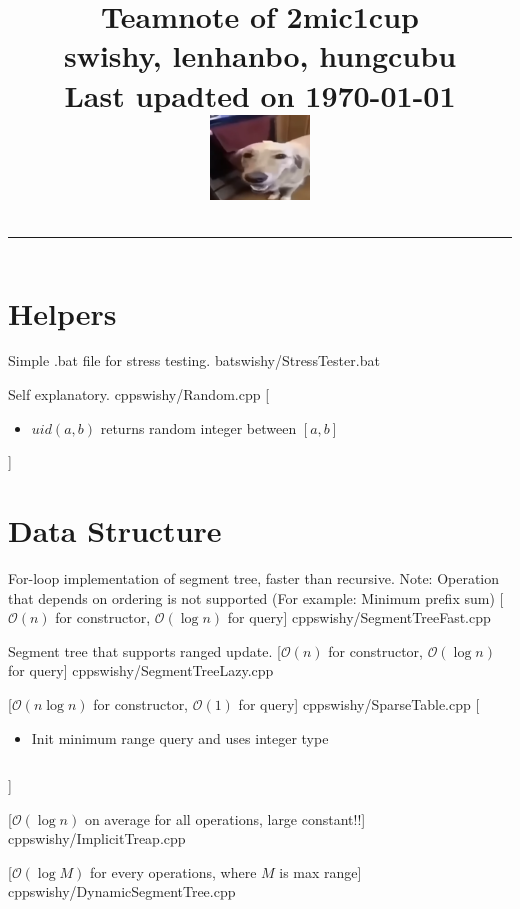\documentclass[10pt,a4paper,oneside,twocolumn]{article}
\title{
    Teamnote of 2mic1cup \\ \vspace{1em}
    \large swishy, lenhanbo, hungcubu \\ \vspace{1em}
    \large Last upadted on \today \\ \vspace{1em}
    \includegraphics[width=0.2\textwidth]{buttadog.png} \vspace{1em}
    \hrule 
}
\date{}
\newcommand{\currentsectiontitle}{}
\newcommand{\msection}[1]{\section{#1}\gdef\currentsectiontitle{#1}}
\begin{document}
\maketitle
\tableofcontents
\newpage


\msection{Helpers}

{Simple .bat file for stress testing.}
{bat}{swishy/StressTester.bat}

{Self explanatory.}
{cpp}{swishy/Random.cpp}
[
\begin{itemize} 
    \item {$uid(a, b)$ returns random integer between $[a, b]$}
\end{itemize}
]

\msection{Data Structure}
{For-loop implementation of segment tree, faster than recursive. Note: Operation that depends on ordering is not supported (For example: Minimum prefix sum)}
[$\mathcal{O}(n)$ for constructor, $\mathcal{O}(\log n)$ for query]
{cpp}{swishy/SegmentTreeFast.cpp}

{Segment tree that supports ranged update.}
[$\mathcal{O}(n)$ for constructor, $\mathcal{O}(\log n)$ for query]
{cpp}{swishy/SegmentTreeLazy.cpp}

[$\mathcal{O}(n\log n)$ for constructor, $\mathcal{O}(1)$ for query]
{cpp}{swishy/SparseTable.cpp}
[
    \begin{itemize}
        \item Init minimum range query and uses integer type \inputminted{cpp}{swishy/examples/SparseTable.cpp}
    \end{itemize}
]

[$\mathcal{O}(\log n)$ on average for all operations, large constant!!]
{cpp}{swishy/ImplicitTreap.cpp}

[$\mathcal{O}(\log M)$ for every operations, where $M$ is max range]
{cpp}{swishy/DynamicSegmentTree.cpp}
\end{document}
